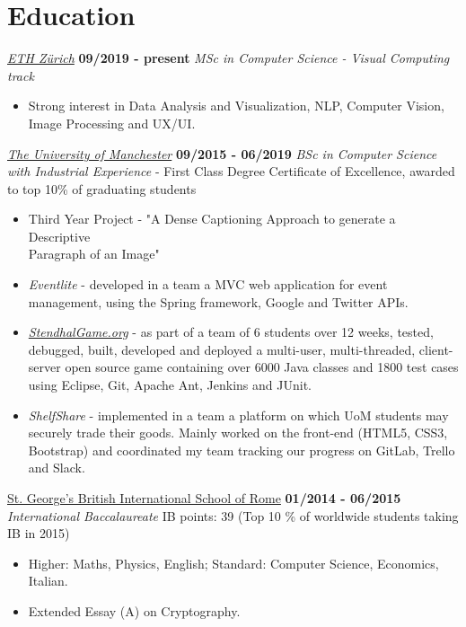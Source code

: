 \documentclass[]{friggeri-cv}
\begin{document}
\section{\color{red}Education}
\begin{entrylist}
    \entry
    {}
    {\emph{\href{https://inf.ethz.ch/studies/master/master-cs.html}{ETH Zürich}}}
    {\textbf{09/2019 - present}}
    {\emph{MSc in Computer Science - Visual Computing track}}
    \begin{itemize}
        \item Strong interest in Data Analysis and Visualization, NLP, Computer Vision, Image Processing and UX/UI.
    \end{itemize}

  \entry
    {}
    {\emph{\href{http://www.manchester.ac.uk/}{The University of Manchester}}}
    {\textbf{09/2015 - 06/2019}}
    {\emph{BSc in Computer Science with Industrial Experience} - First Class Degree}
    {Certificate of Excellence, awarded to top 10\% of graduating students}
    \begin{itemize}
        \item Third Year Project - "A Dense Captioning Approach to generate a Descriptive \\Paragraph of an Image"
        \item \emph{Eventlite} - developed in a team a MVC web application for event management, using the Spring framework, Google and Twitter APIs.
        \item \emph{\href{https://stendhalgame.org/}{StendhalGame.org}} - as part of a team of 6 students over 12 weeks, tested, debugged, built, developed and deployed a multi-user, multi-threaded, client-server open source game containing over 6000 Java classes and 1800 test cases using Eclipse, Git, Apache Ant, Jenkins and JUnit.
        \item \emph{ShelfShare} - implemented in a team a platform on which UoM students may securely trade their goods. Mainly worked on the front-end (HTML5, CSS3, Bootstrap) and coordinated my team tracking our progress on GitLab, Trello and Slack.
    \end{itemize}
  \entry
    {}
    {\href{http://www.stgeorge.school.it/}{St. George's British International School of Rome}}
    {\textbf{01/2014 - 06/2015}}
    {\emph{International Baccalaureate}}
    {IB points: 39  (Top 10 \% of worldwide students taking IB in 2015)}
    \begin{itemize}
        \item Higher: Maths, Physics, English; Standard: Computer Science, Economics, Italian.
        \item Extended Essay (A) on Cryptography.
    \end{itemize}
\end{entrylist}
\end{document}

